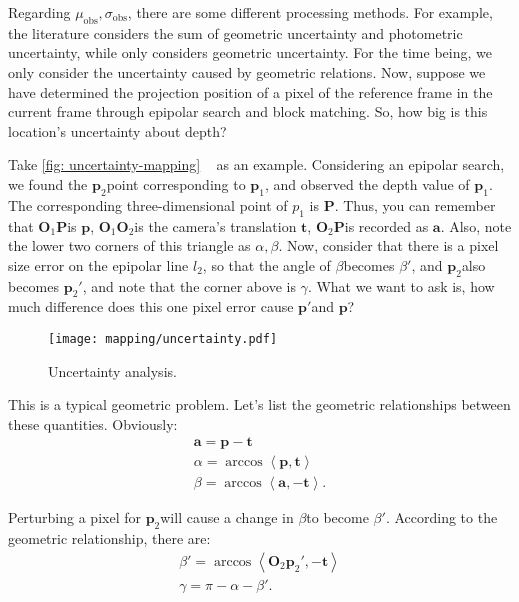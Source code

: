 Regarding $\mu_{\mathrm{obs}}, \sigma_{\mathrm{obs}} $, there are some different processing methods. For example, the literature \cite{Engel2013} considers the sum of geometric uncertainty and photometric uncertainty, while \cite{Vogiatzis2011} only considers geometric uncertainty. For the time being, we only consider the uncertainty caused by geometric relations. Now, suppose we have determined the projection position of a pixel of the reference frame in the current frame through epipolar search and block matching. So, how big is this location's uncertainty about depth?

Take \autoref{fig: uncertainty-mapping} ~ as an example. Considering an epipolar search, we found the $\bm{p}_2 $point corresponding to $\bm{p}_1 $, and observed the depth value of $\bm{p}_1 $. The corresponding three-dimensional point of $p_1$ is $\bm{P} $. Thus, you can remember that $\bm{O}_1 \bm{P} $is $\bm{p} $, $\bm{O}_1 \bm{O}_2 $is the camera's translation $\bm{t} $, $\bm{O}_2 \bm{P} $is recorded as $\bm{a} $. Also, note the lower two corners of this triangle as $\alpha, \beta $. Now, consider that there is a pixel size error on the epipolar line $l_2 $, so that the angle of $\beta $becomes $\beta'$, and $\bm{p}_2 $also becomes $\bm{p }_2'$, and note that the corner above is $\gamma $. What we want to ask is, how much difference does this one pixel error cause $\bm{p}'$and $\bm{p} $?

\begin{figure}[! ht]
\centering
\texttt{[image: mapping/uncertainty.pdf]}
\caption{Uncertainty analysis. }
\label{fig: uncertainty-mapping}
\end{figure}

This is a typical geometric problem. Let's list the geometric relationships between these quantities. Obviously:
\begin{equation}
\begin{array}{l}
\bm{a}=\bm{p} - \bm{t} \\
\alpha =\arccos \left\langle {\bm{p}, \bm{t}} \right\rangle \\
\beta =\arccos \left\langle {\bm{a}, - \bm{t}} \right\rangle .
\end{array}
\end{equation}

Perturbing a pixel for $\bm{p}_2 $will cause a change in $\beta $to become $\beta'$. According to the geometric relationship, there are:
\begin{equation}
\begin{array}{l}
\beta'=\arccos \left\langle {\bm{O}_2 \bm{p}_2', -\bm{t}} \right\rangle \\
\gamma =\pi  - \alpha  - \beta'.
\end{array}
\end{equation}

